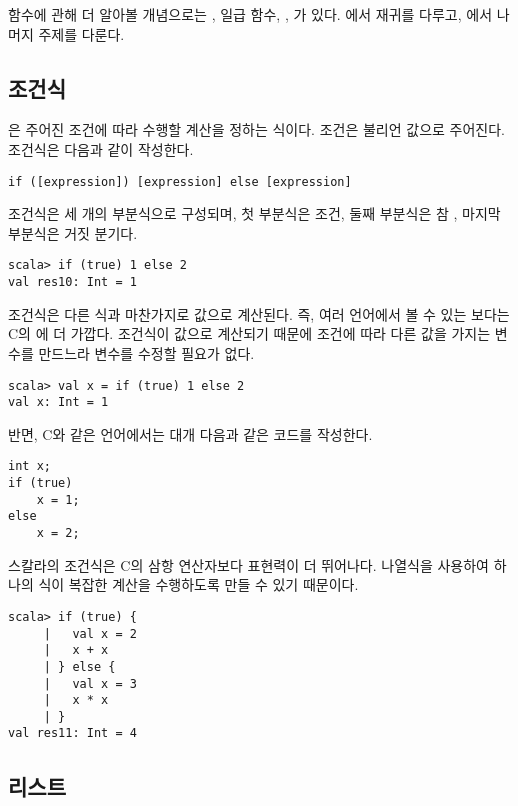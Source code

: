 함수에 관해 더 알아볼 개념으로는 , 일급 함수,
, 가
있다. 에서 재귀를 다루고, 에서 나머지 주제를
다룬다.

\subsection{조건식}

은 주어진 조건에 따라 수행할 계산을 정하는 식이다.
조건은 불리언 값으로 주어진다. 조건식은 다음과 같이 작성한다.

\begin{verbatim}
if ([expression]) [expression] else [expression]
\end{verbatim}

조건식은 세 개의 부분식으로 구성되며, 첫 부분식은 조건, 둘째 부분식은 참
, 마지막 부분식은 거짓 분기다.

\begin{verbatim}
scala> if (true) 1 else 2
val res10: Int = 1
\end{verbatim}

조건식은 다른 식과 마찬가지로 값으로 계산된다. 즉, 여러 언어에서 볼 수 있는
 보다는
C의  에 더 가깝다. 조건식이
값으로 계산되기 때문에 조건에 따라 다른 값을 가지는 변수를 만드느라 변수를
수정할 필요가 없다.

\begin{verbatim}
scala> val x = if (true) 1 else 2
val x: Int = 1
\end{verbatim}

반면, C와 같은 언어에서는 대개 다음과 같은 코드를 작성한다.

\begin{verbatim}
int x;
if (true)
    x = 1;
else
    x = 2;
\end{verbatim}

스칼라의 조건식은 C의 삼항 연산자보다 표현력이 더 뛰어나다. 나열식을 사용하여
하나의 식이 복잡한 계산을 수행하도록 만들 수 있기 때문이다.

\begin{verbatim}
scala> if (true) {
     |   val x = 2
     |   x + x
     | } else {
     |   val x = 3
     |   x * x
     | }
val res11: Int = 4
\end{verbatim}

\subsection{리스트}

